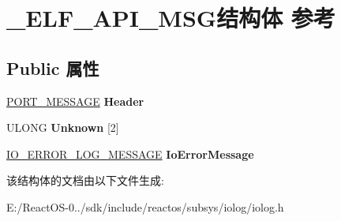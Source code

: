 \hypertarget{struct___e_l_f___a_p_i___m_s_g}{}\section{\+\_\+\+E\+L\+F\+\_\+\+A\+P\+I\+\_\+\+M\+S\+G结构体 参考}
\label{struct___e_l_f___a_p_i___m_s_g}
\subsection*{Public 属性}
\begin{DoxyCompactItemize}
\item 
\mbox{\label{struct___e_l_f___a_p_i___m_s_g_a050e4c75442e88c33919a53a38a637b2}} 
\hyperlink{struct___p_o_r_t___m_e_s_s_a_g_e___h_e_a_d_e_r}{P\+O\+R\+T\+\_\+\+M\+E\+S\+S\+A\+GE} {\bfseries Header}
\item 
\mbox{\label{struct___e_l_f___a_p_i___m_s_g_a31244cfa8696a359b860e7c027f1463e}} 
U\+L\+O\+NG {\bfseries Unknown} \mbox{[}2\mbox{]}
\item 
\mbox{\label{struct___e_l_f___a_p_i___m_s_g_af47db4cc36b56f8d898c64dddabf26f9}} 
\hyperlink{struct___i_o___e_r_r_o_r___l_o_g___m_e_s_s_a_g_e}{I\+O\+\_\+\+E\+R\+R\+O\+R\+\_\+\+L\+O\+G\+\_\+\+M\+E\+S\+S\+A\+GE} {\bfseries Io\+Error\+Message}
\end{DoxyCompactItemize}


该结构体的文档由以下文件生成\+:\begin{DoxyCompactItemize}
\item 
E\+:/\+React\+O\+S-\/0../sdk/include/reactos/subsys/iolog/iolog.\+h\end{DoxyCompactItemize}
